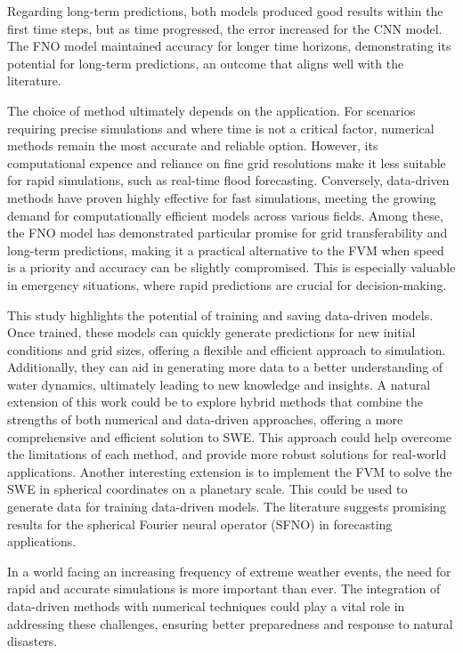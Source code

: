 Regarding long-term predictions, both models produced good results within the first time steps, but as time progressed, the error increased for the CNN model.
The FNO model maintained accuracy for longer time horizons, demonstrating its potential for long-term predictions, an outcome that aligns well with the literature.

The choice of method ultimately depends on the application.
For scenarios requiring precise simulations and where time is not a critical factor, numerical methods remain the most accurate and reliable option.
However, its computational expence and reliance on fine grid resolutions make it less suitable for rapid simulations, such as real-time flood forecasting.
Conversely, data-driven methods have proven highly effective for fast simulations, meeting the growing demand for computationally efficient models across various fields.
Among these, the FNO model has demonstrated particular promise for grid transferability and long-term predictions, making it a practical alternative to the FVM when speed is a priority and accuracy can be slightly compromised.
This is especially valuable in emergency situations, where rapid predictions are crucial for decision-making.

This study highlights the potential of training and saving data-driven models.
Once trained, these models can quickly generate predictions for new initial conditions and grid sizes, offering a flexible and efficient approach to simulation.
Additionally, they can aid in generating more data to a better understanding of water dynamics, ultimately leading to new knowledge and insights.
A natural extension of this work could be to explore hybrid methods that combine the strengths of both numerical and data-driven approaches, offering a more comprehensive and efficient solution to SWE.
This approach could help overcome the limitations of each method, and provide more robust solutions for real-world applications.
Another interesting extension is to implement the FVM to solve the SWE in spherical coordinates on a planetary scale.
This could be used to generate data for training data-driven models.
The literature suggests promising results for the spherical Fourier neural operator (SFNO) in forecasting applications.

In a world facing an increasing frequency of extreme weather events, the need for rapid and accurate simulations is more important than ever.
The integration of data-driven methods with numerical techniques could play a vital role in addressing these challenges, ensuring better preparedness and response to natural disasters. 
